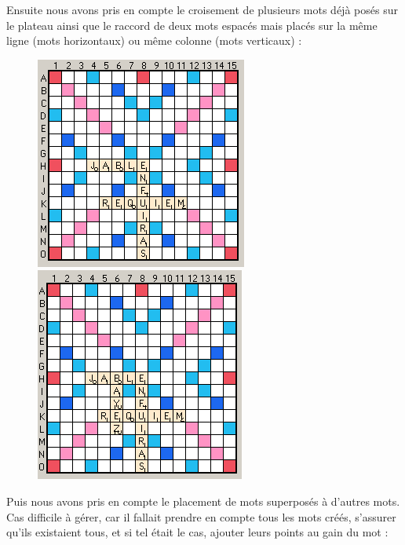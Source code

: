 \documentclass[a4paper,8pt,french,fleqn]{article}
\begin{document}
Ensuite nous avons pris en compte le croisement de plusieurs mots déjà posés sur le plateau ainsi que le raccord de deux mots espacés mais placés sur la même ligne (mots horizontaux) ou même colonne (mots verticaux) :

\begin{figure}[h]
  \begin{center}
    \vspace{0.2cm}
    \includegraphics[scale=0.5]{cas2a.png}
    \hspace{1.5cm}
    \includegraphics[scale=0.5]{cas2b.png}
  \end{center}
\end{figure}

Puis nous avons pris en compte le placement de mots superposés à d'autres mots. Cas difficile à gérer, car il fallait prendre en compte tous les mots créés, s'assurer qu'ils existaient tous, et si tel était le cas, ajouter leurs points au gain du mot : 
\end{document}
